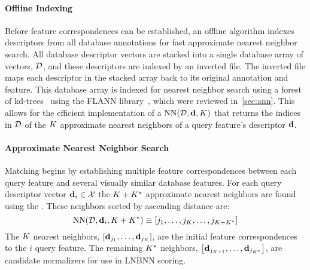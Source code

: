         \paragraph{Offline Indexing}
            Before feature correspondences can be established, an offline algorithm indexes descriptors from all
              database annotations for fast approximate nearest neighbor search.
            All database descriptor vectors are stacked into a single database array of vectors, %
            $\mathcal{D}$, %
            and these descriptors are indexed by an inverted file.
            The inverted file maps each descriptor in the stacked array back to its original annotation and
              feature.
            This database array is indexed for nearest neighbor search using a forest of
              kd-trees~\cite{silpa_anan_optimised_2008} using the FLANN library~\cite{muja_fast_2009}, which were
              reviewed in~\cref{sec:ann}.
            This allows for the efficient implementation of a   %
            $\operatorname{NN}(\mathcal{D}, \mathbf{d}, K)$  %
            that returns the indices in $\mathcal{D}$ of the $K$ approximate nearest neighbors of a query feature's
              descriptor $\mathbf{d}$.

        \paragraph{Approximate Nearest Neighbor Search}

            Matching begins by establishing multiple feature correspondences between each query feature and
              several visually similar database features.
            For each query descriptor vector $\mathbf{d}_i \in \mathcal{X}$ the $K + K^{*}$ approximate nearest neighbors are
              found using the .
            These neighbors sorted by ascending distance are:
            \begin{equation}
                \operatorname{NN}(\mathcal{D}, \mathbf{d}_i, K + K^{*}) \equiv \left[j_1{}, \ldots{}, j_{K}, \ldots, j_{K + K^{*}}\right]
            \end{equation}
            The $K$ nearest neighbors, $\left[\mathbf{d}_{{j_1}}, \ldots{}, \mathbf{d}_{{j_{K}}}\right]$, are the initial feature
              correspondences to the $i$\th{} query feature.
            The remaining $K^{*}$ neighbors, $\left[\mathbf{d}_{{j_{K + 1}}}, \ldots{}, \mathbf{d}_{j_{K^{*}}}\right]$, are candidate
              normalizers for use in LNBNN scoring.

